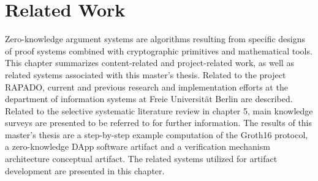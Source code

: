 \chapter{Related Work}
\begin{comment}
-knowledge base I build upon
- related papers can be: content related, methodology, technical -->structure accordingly

(in a thesis, it is mandatory to have Related Systems, when you implement an application)
\end{comment}

Zero-knowledge argument systems are algorithms resulting from specific designs of proof systems combined with cryptographic primitives and mathematical tools. This chapter summarizes content-related and project-related work, as well as related systems associated with this master's thesis. Related to the project RAPADO, current and previous research and implementation efforts at the department of information systems at Freie Universit{\"a}t Berlin are described. Related to the selective systematic literature review in chapter 5, main knowledge surveys are presented to be referred to for further information. The results of this master's thesis are a step-by-step example computation of the Groth16 protocol, a zero-knowledge DApp software artifact and a verification mechanism architecture conceptual artifact. The related systems utilized for artifact development are presented in this chapter.

